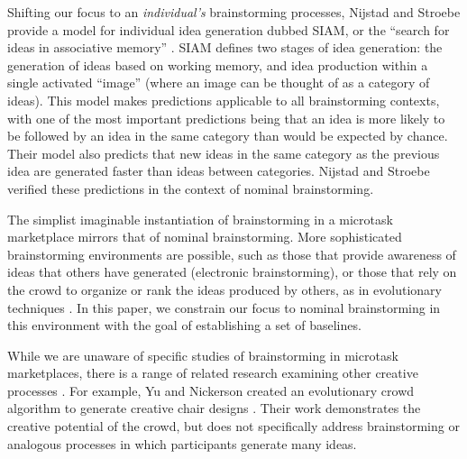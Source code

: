 Shifting our focus to an \emph{individual's} brainstorming processes, Nijstad and Stroebe provide a model for individual idea generation dubbed SIAM, or the ``search for ideas in associative memory'' \cite{nijstad_how_2006}. SIAM defines two stages of idea generation: the generation of ideas based on working memory, and idea production within a single activated ``image'' (where an image can be thought of as a category of ideas). This model makes predictions applicable to all brainstorming contexts, with one of the most important predictions being that an idea is more likely to be followed by an idea in the same category than would be expected by chance. Their model also predicts that new ideas in the same category as the previous idea are generated faster than ideas between categories. Nijstad and Stroebe verified these predictions in the context of nominal brainstorming.

The simplist imaginable instantiation of brainstorming in a microtask marketplace mirrors that of nominal brainstorming. More sophisticated brainstorming environments are possible, such as those that provide awareness of ideas that others have generated (electronic brainstorming), or those that rely on the crowd to organize or rank the ideas produced by others, as in evolutionary techniques \cite{yu_cooks_2011}.
In this paper, we constrain our focus to nominal brainstorming in this environment with the goal of establishing a set of baselines.

While we are unaware of specific studies of brainstorming in microtask marketplaces, there is a range of related research examining other creative processes \cite{lewis2011affective, kittur2011crowdforge, Zhang:2012:HCT:2207676.2207708}. For example, Yu and Nickerson created an evolutionary crowd algorithm to generate creative chair designs \cite{yu_cooks_2011}. Their work demonstrates the creative potential of the crowd, but does not specifically address brainstorming or analogous processes in which participants generate many ideas. 

